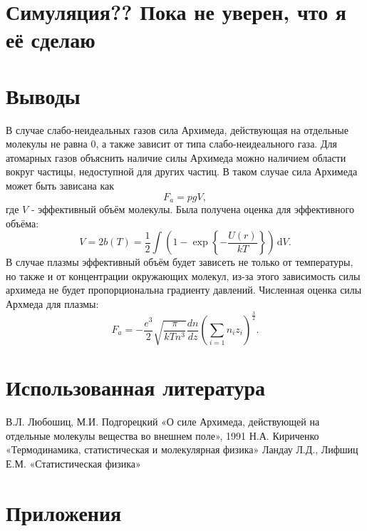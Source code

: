 \documentclass[12pt]{article}
\begin{document}
\section{Симуляция?? Пока не уверен, что я её сделаю}
\section{Выводы}
В случае слабо-неидеальных газов сила Архимеда, действующая на отдельные молекулы не равна 0, а также 
зависит от типа слабо-неидеального газа. Для атомарных газов объяснить наличие силы Архимеда можно 
наличием области вокруг частицы, недоступной для других частиц. В таком случае сила Архимеда может быть зависана 
как 
\[
    F_a = pgV, 
\]
где $V$ - эффективный объём молекулы. Была получена оценка для эффективного объёма: 
\[
    V = 2b(T) = \frac{1}{2} \int \left( 1 - \exp \left\{ -\frac{U(r)}{kT} \right\}  \right)  \,\mathrm{d}V.
\] 
В случае плазмы эффективный объём будет зависеть не только от температуры, но также и от концентрации 
окружающих молекул, из-за этого зависимость силы архимеда не будет пропорциональна градиенту давлений. 
Численная оценка силы Архмеда для плазмы: 
\[
    F_a = -\frac{e^3}{2} \sqrt{\frac{\pi}{kTn^3}} \frac{dn}{dz} \left( \sum_{i=1} n_i z_i \right)^\frac{3}{2}.
\]

\section{Использованная литература}
\begin{thebibliography}{9}
    В.Л. Любошиц, М.И. Подгорецкий «О силе Архимеда, действующей на отдельные молекулы вещества во внешнем поле», 1991
    Н.А. Кириченко «Термодинамика, статистическая и молекулярная физика»
    Ландау Л.Д., Лифшиц Е.М. «Статистическая физика»
\end{thebibliography}

\section{Приложения}
\end{document}
